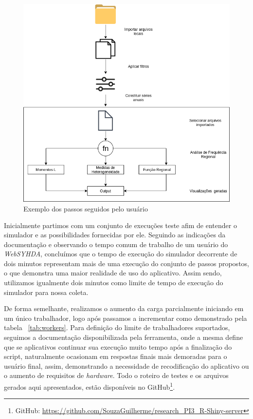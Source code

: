 \documentclass[12pt,english,brazil]{article}
\begin{document}
\begin{figure}[htbp]
  \centering 
  \includegraphics[scale=.4]{paperWSCAD2021/figures/useWebSYHDADrawio.png}
  \caption{Exemplo dos passos seguidos pelo usuário}
  \label{usoWebSYHDA}
\end{figure}

Inicialmente partimos com um conjunto de execuções teste afim de entender o simulador e as possibilidades fornecidas por ele. Seguindo as indicações da documentação e observando o tempo comum de trabalho de um usuário do \emph{WebSYHDA}, concluímos que o tempo de execução do simulador decorrente de%
dois minutos representam mais de uma execução do conjunto de passos propostos, o que demonstra uma maior realidade de uso do aplicativo. Assim sendo, utilizamos igualmente dois minutos como limite de tempo de execução do simulador para nossa coleta.




De forma semelhante, realizamos o aumento da carga parcialmente iniciando em um único trabalhador, logo após passamos a incrementar como demonstrado pela tabela ~\ref{tab:workers}. Para definição do limite de trabalhadores suportados, seguimos a documentação disponibilizada pela ferramenta, onde a mesma define que se aplicativos continuar sua execução muito tempo após a finalização do script, naturalmente ocasionam em respostas finais mais demoradas para o usuário final, assim, demonstrando a necessidade de recodificação do aplicativo ou o aumento de requisitos de \emph{hardware}. Todo o roteiro de testes e os arquivos gerados aqui apresentados, estão disponíveis no GitHub\footnote{GitHub: \url{https://github.com/SouzaGuilherme/research_PI3_R-Shiny-server}}.
\end{document}
